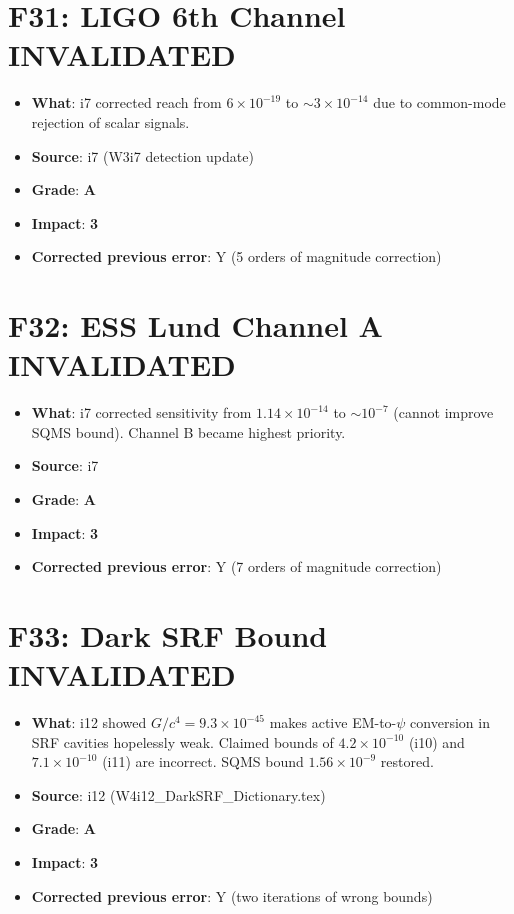 \documentclass[11pt,a4paper]{article}
\newcommand{\grade}[1]{\textbf{#1}}
\newcommand{\impact}[1]{\textbf{#1}}
\begin{document}
\section{F31: LIGO 6th Channel INVALIDATED}
\begin{itemize}[nosep]
\item \textbf{What}: i7 corrected reach from $6 \times 10^{-19}$ to $\sim 3 \times 10^{-14}$ due to common-mode rejection of scalar signals.
\item \textbf{Source}: i7 (W3i7 detection update)
\item \textbf{Grade}: \grade{A}
\item \textbf{Impact}: \impact{3}
\item \textbf{Corrected previous error}: Y (5 orders of magnitude correction)
\end{itemize}

\section{F32: ESS Lund Channel A INVALIDATED}
\begin{itemize}[nosep]
\item \textbf{What}: i7 corrected sensitivity from $1.14 \times 10^{-14}$ to $\sim 10^{-7}$ (cannot improve SQMS bound). Channel B became highest priority.
\item \textbf{Source}: i7
\item \textbf{Grade}: \grade{A}
\item \textbf{Impact}: \impact{3}
\item \textbf{Corrected previous error}: Y (7 orders of magnitude correction)
\end{itemize}

\section{F33: Dark SRF Bound INVALIDATED}
\begin{itemize}[nosep]
\item \textbf{What}: i12 showed $G/c^4 = 9.3 \times 10^{-45}$ makes active EM-to-$\psi$ conversion in SRF cavities hopelessly weak. Claimed bounds of $4.2 \times 10^{-10}$ (i10) and $7.1 \times 10^{-10}$ (i11) are incorrect. SQMS bound $1.56 \times 10^{-9}$ restored.
\item \textbf{Source}: i12 (W4i12\_DarkSRF\_Dictionary.tex)
\item \textbf{Grade}: \grade{A}
\item \textbf{Impact}: \impact{3}
\item \textbf{Corrected previous error}: Y (two iterations of wrong bounds)
\end{itemize}
\end{document}
